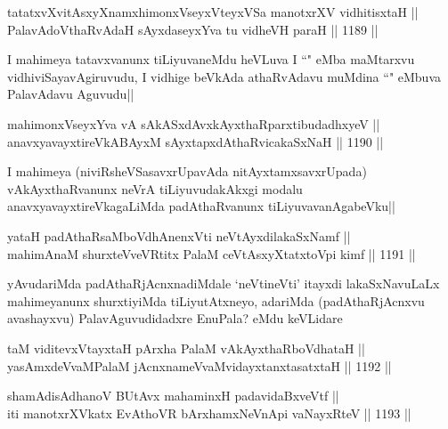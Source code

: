 \begin{shl}
tatatxvXvitAsxyXnamxhimonxV\s seyxVteyxVSa manotxrXV vidhitisxtaH || \\
PalavAdoV\s thaRvAdaH sAyxdaseyxYva tu vidheVH paraH ||  1189 ||  
\end{shl}

\begin{artha}
I mahimeya tatavxvanunx tiLiyuvaneMdu heVLuva I ``\stext" eMba maMtarxvu vidhiviSayavAgiruvudu, I vidhige beVkAda athaRvAdavu muMdina ``\stext" eMbuva PalavAdavu Aguvudu||
\end{artha}

\begin{shl}
mahimonxV\s seyxYva vA sAkASxdAvxkAyxthaRparxtibudadhxyeV || \\
anavxyavayxtireVkABAyxM sAyxtapxdAthaRvicakaSxNaH ||  1190 ||  
\end{shl}

\begin{artha}
I mahimeya (niviRsheVSasavxrUpavAda nitAyxtamxsavxrUpada) vAkAyxthaRvanunx neVrA tiLiyuvudakAkxgi modalu anavxyavayxtireVkagaLiMda padAthaRvanunx tiLiyuvavanAgabeVku||
\end{artha}


\begin{shl}
yataH padAthaRsaMboVdhAnenxVti neVtAyxdilakaSxNamf || \\
mahimAnaM shurxteVveVRtitx PalaM ceVtAsxyXtatxtoV\s pi kimf ||  1191 ||  
\end{shl}

\begin{artha}
yAvudariMda padAthaRjAcnxnadiMdale `neVtineVti' itayxdi lakaSxNavuLaLx mahimeyanunx shurxtiyiMda tiLiyutAtxneyo, adariMda (padAthaRjAcnxvu avashayxvu) PalavAguvudidadxre EnuPala? eMdu keVLidare
\end{artha}

\begin{shl}
taM viditevxVtayxtaH pArxha PalaM vAkAyxthaRboVdhataH || \\
yasAmxdeVvaMPalaM jAcnxnameVvaMvidayxtanxtasatxtaH ||  1192 ||  
\end{shl}
				
\begin{shl}
shamAdisAdhanoV BUtAvx mahaminxH padavidaBxveVtf ||  \\
iti manotxrXVkatx EvAthoVR bArxhamxNeVnApi vaNayxRteV ||  1193 ||  
\end{shl}

